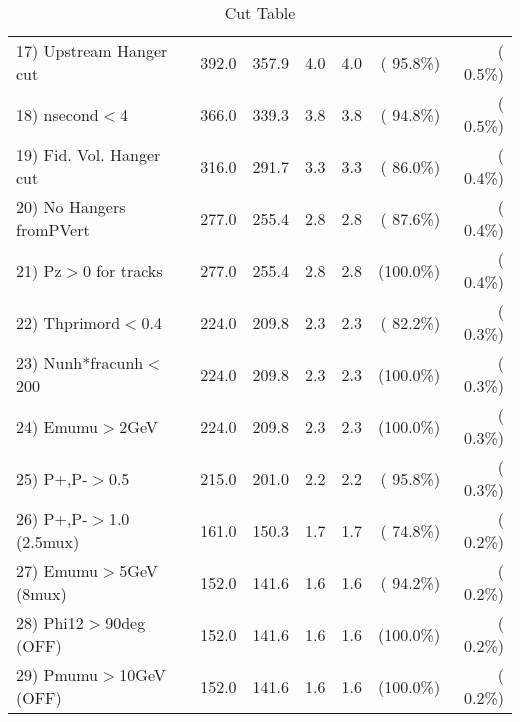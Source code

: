 \begin{table}[h!]
\begin{tabular}{||l||r|r|r|r|r|r||}
 17) Upstream Hanger cut  &        392.0 &        357.9 &          4.0 &          4.0 & ( 95.8\%) & (  0.5\%) \\
 18) nsecond$<$4          &        366.0 &        339.3 &          3.8 &          3.8 & ( 94.8\%) & (  0.5\%) \\
 19) Fid. Vol. Hanger cut &        316.0 &        291.7 &          3.3 &          3.3 & ( 86.0\%) & (  0.4\%) \\
 20) No Hangers fromPVert &        277.0 &        255.4 &          2.8 &          2.8 & ( 87.6\%) & (  0.4\%) \\
 21) Pz$>$0 for tracks    &        277.0 &        255.4 &          2.8 &          2.8 & (100.0\%) & (  0.4\%) \\
 22) Thprimord$<$0.4      &        224.0 &        209.8 &          2.3 &          2.3 & ( 82.2\%) & (  0.3\%) \\
 23) Nunh*fracunh$<$200   &        224.0 &        209.8 &          2.3 &          2.3 & (100.0\%) & (  0.3\%) \\
 24) Emumu$>$2GeV         &        224.0 &        209.8 &          2.3 &          2.3 & (100.0\%) & (  0.3\%) \\
 25) P+,P-$>$0.5          &        215.0 &        201.0 &          2.2 &          2.2 & ( 95.8\%) & (  0.3\%) \\
 26) P+,P-$>$1.0 (2.5mux) &        161.0 &        150.3 &          1.7 &          1.7 & ( 74.8\%) & (  0.2\%) \\
 27) Emumu$>$5GeV  (8mux) &        152.0 &        141.6 &          1.6 &          1.6 & ( 94.2\%) & (  0.2\%) \\
 28) Phi12$>$90deg  (OFF) &        152.0 &        141.6 &          1.6 &          1.6 & (100.0\%) & (  0.2\%) \\
 29) Pmumu$>$10GeV  (OFF) &        152.0 &        141.6 &          1.6 &          1.6 & (100.0\%) & (  0.2\%) \\
 \hline
 \hline
 \end{tabular}
 \caption{Cut Table           }
 \label{tab-cutcohjpsi-mumu_anuecc}
 \end{table}
